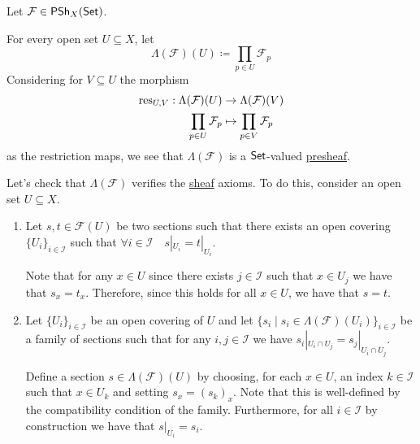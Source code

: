 \documentclass[../../../main]{subfiles}
\begin{document}
\begin{construction} \label{const:sheafification-godement}
  Let \(\mathcal{F} \in \mathsf{PSh}_{X}(\mathsf{\mathsf{Set}})\).

  For every open set \(U \subseteq X\), let
  \begin{equation*}
    \Lambda(\mathcal{F})(U) \coloneq \prod_{p \in U} \mathcal{F}_{p}
  \end{equation*}
  Considering for \(V \subseteq U\) the morphism
  \begin{align*}
    \operatorname{res}_{U, V}: \Lambda(\mathcal{F})(U) &\to \Lambda(\mathcal{F})(V) \\
    \prod_{p \in U} \mathcal{F}_{p} &\mapsto \prod_{p \in V} \mathcal{F}_{p}
  \end{align*}
  as the restriction maps, we see that \(\Lambda(\mathcal{F})\) is a \(\mathsf{\mathsf{Set}}\)-valued \hyperref[def:presheaf]{presheaf}.

  Let's check that \(\Lambda(\mathcal{F})\) verifies the \hyperref[def:set-valued-sheaf]{sheaf} axioms.
  To do this, consider an open set \(U \subseteq X\).
  \begin{enumerate}[label=SH.\arabic*), ref=SH.\arabic*]
    \item Let \(s, t \in \mathcal{F}(U)\) be two sections such that there exists an open covering \(\{U_{i}\}_{i \in \mathcal{I}}\) such that \(\forall i \in \mathcal{I} \quad s|_{U_{i}} = t|_{U_{i}}\).

          Note that for any \(x \in U\) since there exists \(j \in \mathcal{I}\) such that \(x \in U_{j}\) we have that \(s_{x} = t_{x}\).
          Therefore, since this holds for all \(x \in U\), we have that \(s = t\).
    \item Let \(\{U_{i}\}_{i \in \mathcal{I}}\) be an open covering of \(U\) and let \(\{s_{i} \mid s_{i} \in \Lambda(\mathcal{F})(U_{i})\}_{i \in \mathcal{I}}\) be a family of sections such that for any \(i, j \in \mathcal{I}\) we have \(s_{i}|_{U_{i} \cap U_{j}} = s_{j}|_{U_{i} \cap U_{j}}\).

          Define a section \(s \in \Lambda(\mathcal{F})(U)\) by choosing, for each \(x \in U\), an index \(k \in \mathcal{I}\) such that \(x \in U_{k}\) and setting \(s_{x} = (s_{k})_{x}\).
          Note that this is well-defined by the compatibility condition of the family.
          Furthermore, for all \(i \in \mathcal{I}\) by construction we have that \(s|_{U_{i}} = s_{i}\).
  \end{enumerate}


\end{construction}
\end{document}
